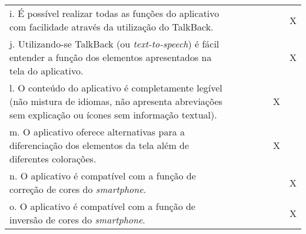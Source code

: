 \documentclass[portuguese,oneside]{tcc}
\begin{document}
\begin{center}
\begin{longtabu}{|L{25em}|c|c|c|c|c|c|}
																												i. É possível realizar todas as funções do aplicativo com facilidade através da utilização do TalkBack.	& & & & & & X \\ 
																												j. Utilizando-se TalkBack (ou \emph{text-to-speech}) é fácil entender a função dos elementos apresentados na tela do aplicativo. & & & & & & X \\ 
																												l. O conteúdo do aplicativo é completamente legível (não mistura de idiomas, não apresenta abreviações sem explicação ou ícones sem informação textual). & & & & & X & \\ 
																												m. O aplicativo oferece alternativas para a diferenciação dos elementos da tela além de diferentes colorações. & & & & & X & \\ 
																												n. O aplicativo é compatível com a função de correção de cores do \emph{smartphone}. & & & & & & X \\ 
																												o. O aplicativo é compatível com a função de inversão de cores do \emph{smartphone}. & & & & & & X \\ 
																											\end{longtabu}
																										\end{center}
																										
\end{document}
